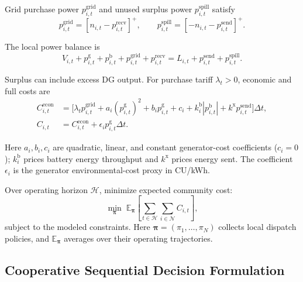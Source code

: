 Grid purchase power $p_{i,t}^{\mathrm{grid}}$ and unused surplus power
$p_{i,t}^{\mathrm{spill}}$ satisfy
\begin{equation}
 p_{i,t}^{\mathrm{grid}}=[n_{i,t}-p_{i,t}^{\mathrm{recv}}]^+,\qquad
 p_{i,t}^{\mathrm{spill}}=[-n_{i,t}-p_{i,t}^{\mathrm{send}}]^+.
 \label{eq:grid-spill}
\end{equation}

The local power balance is
\begin{equation}
 V_{i,t}+p_{i,t}^{\mathrm{g}}+p_{i,t}^{\mathrm{b}}
       +p_{i,t}^{\mathrm{grid}}+p_{i,t}^{\mathrm{recv}}
 =L_{i,t}+p_{i,t}^{\mathrm{send}}+p_{i,t}^{\mathrm{spill}}.
 \label{eq:power-balance}
\end{equation}

Surplus can include excess DG output. For purchase tariff $\lambda_t>0$,
economic and full costs are
\begin{align}
 C_{i,t}^{\mathrm{econ}}&=\big[
 \lambda_t p_{i,t}^{\mathrm{grid}}
 +a_i(p_{i,t}^{\mathrm{g}})^2+b_i p_{i,t}^{\mathrm{g}}+c_i
 +k_i^{\mathrm{b}}|p_{i,t}^{\mathrm{b}}|
 +k^{\mathrm{x}}p_{i,t}^{\mathrm{send}}\big]\Delta t,
 \label{eq:economic-cost}\\
 C_{i,t}&=C_{i,t}^{\mathrm{econ}}
              +\epsilon_i p_{i,t}^{\mathrm{g}}\Delta t.
 \label{eq:full-cost}
\end{align}

Here $a_i,b_i,c_i$ are quadratic, linear, and constant generator-cost
coefficients ($c_i=0$); $k_i^{\mathrm{b}}$ prices battery energy throughput
and $k^{\mathrm{x}}$ prices energy sent. The coefficient $\epsilon_i$
is the generator environmental-cost proxy in CU/kWh.

Over operating horizon $\mathcal{H}$, minimize expected community cost:
\begin{equation}
 \min_{\boldsymbol{\pi}}\;
 \mathbb{E}_{\boldsymbol{\pi}}
 \left[\sum_{t\in\mathcal{H}}\sum_{i\in\mathcal{N}}C_{i,t}\right],
 \label{eq:dispatch-objective}
\end{equation}
subject to the modeled constraints. Here $\boldsymbol{\pi}=(\pi_1,\ldots,\pi_N)$
collects local dispatch policies, and $\mathbb{E}_{\boldsymbol{\pi}}$
averages over their operating trajectories.

\subsection{Cooperative Sequential Decision Formulation}
\label{sec:decision}


